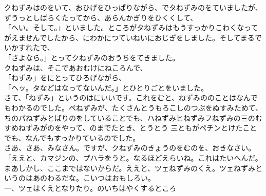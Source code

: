 \documentclass[
a4paper,
10pt,
book]
{tarticle}
\begin{document}
\newpage
\thispagestyle{fancy}
\fancyhead[R]{\empty}
\indent クねずみはのをいて、おひげをひっぱりながら、でタねずみのをていましたが、ずうっとしばらくたってから、あらんかぎりをひくくして、\\
「へい。そして。」といました。ところがタねずみはもうすっかりこわくなってがえませんでしたから、にわかにつていねいにおじぎをしました。そしてまるでいかすれたで、\\
「さよなら。」とってクねずみのおうちをてきました。\\
\indent クねずみは、そこであおむけにねころんで、\\
「ねずみ」をにとってひろげながら、\\
「ヘッ。タなどはなってないんだ。」とひとりごとをいました。\\
\indent さて、「ねずみ」というのはにいいです。これをむと、ねずみののことはなんでもわかるのでした。ペねずみが、たくさんとうもろこしのつぶをぬすみためて、ちのパねずみとばりのをしていることでも、ハねずみヒねずみフねずみの三のむすめねずみがのをやって、のまでたとき、とうとう
三ともがペチンとけたことでも、なんでもすっかりているのでした。\\
\indent さあ、さあ、みなさん。ですが、クねずみのきょうのをむのを、おきなさい。\\
「ええと、カマジンの、プハラをうと。なるほどえらいね。これはたいへんだ。まあしかし、ここまではないからだ。ええと、ツェねずみのくえ。ツェねずみというのはあのわるだな。こいつはおもしろい。\\
\indent {}一、ツェはくえとなりたり。のいちはやくするところ
\end{document}
